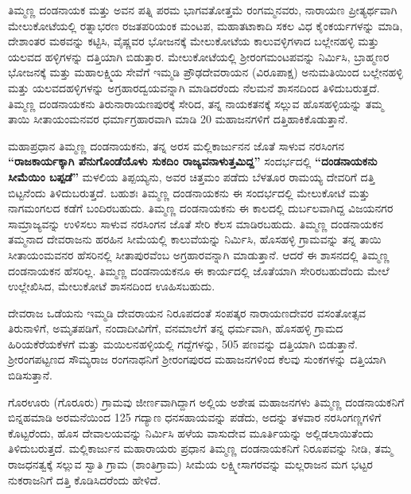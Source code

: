 ತಿಮ್ಮಣ್ಣ ದಂಡನಾಯಕ ಮತ್ತು ಅವನ ಪತ್ನಿ ಪರಮ ಭಾಗವತೋತ್ತಮೆ ರಂಗಮ್ಮನವರು, ನಾರಾಯಣ ಪ್ರೀತ್ಯರ್ಥವಾಗಿ ಮೇಲುಕೋಟೆಯಲ್ಲಿ ರತ್ನಾಭರಣ ರಜತಪರಿಯಂಕ ಮಂಟಪ, ಮಹಾತಟಾಕಾದಿ ಸಕಲ ವಿಧ ಕೈಂಕರ್ಯಗಳನ್ನು ಮಾಡಿ, ದೇಶಾಂತರ ಮಠವನ್ನು ಕಟ್ಟಿಸಿ, ವೈಷ್ಣವರ ಭೋಜನಕ್ಕೆ ಮೇಲುಕೋಟೆಯ ಕಾಲುವಳ್ಳಿಗಳಾದ ಬಲ್ಲೇನಹಳ್ಳಿ ಮತ್ತು ಯಲವದ ಹಳ್ಳಿಗಳನ್ನು ದತ್ತಿಯಾಗಿ ಬಿಡುತ್ತಾರ. ಮೇಲುಕೋಟೆಯಲ್ಲಿ ಶ‍್ರೀರಂಗಮಂಟಪವನ್ನು ನಿರ್ಮಿಸಿ, ಬ್ರಾಹ್ಮಣರ ಭೋಜನಕ್ಕೆ ಮತ್ತು ಮಹಾಲಕ್ಷ್ಮಿಯ ಸೇವೆಗೆ ಇಮ್ಮಡಿ ಪ್ರೌಢದೇವರಾಯನ (ವಿರೂಪಾಕ್ಷ) ಅನುಮತಿಯಿಂದ ಬಲ್ಲೇನಹಳ್ಳಿ ಮತ್ತು ಯಲವದಹಳ್ಳಿಗಳನ್ನು ಅಗ್ರಹಾರದ್ವಯವನ್ನಾಗಿ ಮಾಡಿದರೆಂದು ನೆಲಮನೆ ಶಾಸನದಿಂದ ತಿಳಿದುಬರುತ್ತದೆ. ತಿಮ್ಮಣ್ಣ ದಂಡನಾಯಕನು ತಿರುನಾರಾಯಣಪುರಕ್ಕೆ ಸೇರಿದ, ತನ್ನ ನಾಯಕತನಕ್ಕೆ ಸಲ್ಲುವ ಹೊಸಹಳ್ಳಿಯನ್ನು ತಮ್ಮ ತಾಯಿ ಸೀತಾಯಂಮ\-ನವರ ಧರ್ಮಾಗ್ರಹಾರವಾಗಿ ಮಾಡಿ 20 ಮಹಾಜನಗಳಿಗೆ ದತ್ತಿಹಾಕಿಕೊಡುತ್ತಾನೆ.

ಮಹಾಪ್ರಧಾನ ತಿಮ್ಮಣ್ಣ ದಂಡನಾಯಕನು, ತನ್ನ ಅರಸ ಮಲ್ಲಿಕಾರ್ಜುನನ ಜೊತೆ ಸಾಳುವ ನರಸಿಂಗನ \textbf{“ರಾಜಕಾರ್ಯ\-ಕ್ಕಾಗಿ ಪೆನುಗೊಂಡೆಯೊಳು ಸುಕದಿಂ ರಾಜ್ಯವನಾಳುತ್ತಮಿದ್ದ”} ಸಂದರ್ಭದಲ್ಲಿ \textbf{“ದಂಡನಾಯಕನು ಸೀಮೆಯಿಂ ಬಪ್ಪಡೆ”} ಮಳಲಿಯ ತಿಪ್ಪಯ್ಯನು, ಅವರ ಚಿತ್ತಮಂ ಪಡೆದು ಬೆಳತೂರ ರಾಮಯ್ಯ ದೇವರಿಗೆ ದತ್ತಿ ಬಿಟ್ಟನೆಂದು ತಿಳಿದುಬರುತ್ತದೆ. ಬಹುಶಃ ತಿಮ್ಮಣ್ಣ ದಂಡನಾಯಕನು ಈ ಸಂದರ್ಭದಲ್ಲಿ ಮೇಲುಕೋಟೆ ಮತ್ತು ನಾಗಮಂಗಲದ ಕಡೆಗೆ ಬಂದಿರಬಹುದು. ತಿಮ್ಮಣ್ಣ ದಂಡನಾಯಕನು ಈ ಕಾಲದಲ್ಲಿ ದುರ್ಬಲವಾಗಿದ್ದ ವಿಜಯನಗರ ಸಾಮ್ರಾಜ್ಯವನ್ನು ಉಳಿಸಲು ಸಾಳುವ ನರಸಿಂಗನ ಜೊತೆ ಸೇರಿ ಕೆಲಸ ಮಾಡಿರಬಹುದು. ತಿಮ್ಮಣ್ಣ ದಂಡನಾಯಕನ ತಮ್ಮನಾದ ದೇವರಾಜನು ಹರಹಿನ ಸೀಮೆಯಲ್ಲಿ ಕಾಲುವೆಯನ್ನು ನಿರ್ಮಿಸಿ, ಹೊಸಹಳ್ಳಿ ಗ್ರಾಮವನ್ನು ತನ್ನ ತಾಯಿ ಸೀತಾಯಂಮವನರ ಹೆಸರಿನಲ್ಲಿ ಸೀತಾಪುರವೆಂಬ ಅಗ್ರಹಾರವನ್ನಾಗಿ ಮಾಡುತ್ತಾನೆ. ಆದರೆ ಈ ಶಾಸನದಲ್ಲಿ ತಿಮ್ಮಣ್ಣ ದಂಡನಾಯಕನ ಹೆಸರಿಲ್ಲ. ತಿಮ್ಮಣ್ಣ ದಂಡನಾಯಕನೂ ಈ ಕಾರ್ಯದಲ್ಲಿ ಜೊತೆಯಾಗಿ ಸೇರಿರಬಹುದೆಂದು ಮೇಲೆ ಉಲ್ಲೇಖಿಸಿದ, ಮೇಲುಕೋಟೆ ಶಾಸನದಿಂದ ಊಹಿಸಬಹುದು.

ದೇವರಾಜ ಒಡೆಯನು ಇಮ್ಮಡಿ ದೇವರಾಯನ ನಿರೂಪದಂತೆ ಸಂಪತ್ಕರ ನಾರಾಯಣದೇವರ ವಸಂತೋತ್ಸವ ತಿರುನಾಳಿಗೆ, ಅಮೃತಪಡಿಗೆ, ನಂದಾದೀವಿಗೆಗೆ, ವನಮಾಲೆಗೆ ತನ್ನ ಧರ್ಮವಾಗಿ, ಹೊಸಹಳ್ಳಿ ಗ್ರಾಮದ ಹಿರಿಯಕೆರೆಯಕೆಳಗೆ ಮತ್ತು ಮಯಿಲನಹಳ್ಳಿಯಲ್ಲಿ ಗದ್ದೆಗಳನ್ನು, 505 ಪಣವನ್ನು ದತ್ತಿಯಾಗಿ ಬಿಡುತ್ತಾನೆ. ಶ‍್ರೀರಂಗಪಟ್ಟಣದ ಸೌಮ್ಯರಾಜ ರಂಗನಾಥನಿಗೆ ಶ‍್ರೀರಂಗಪುರದ ಮಹಾಜನಗಳಿಂದ ಕೆಲವು ಸುಂಕಗಳನ್ನು ದತ್ತಿಯಾಗಿ ಬಿಡಿಸುತ್ತಾನೆ.

ಗೊರಊರು (ಗೊರೂರು) ಗ್ರಾಮವು ಜೀರ್ಣವಾಗಿದ್ದಾಗ ಅಲ್ಲಿಯ ಅಶೇಷ ಮಹಾಜನಗಳು ತಿಮ್ಮಣ್ಣ ದಂಡನಾಯಕ\-ನಿಗೆ ಬಿನ್ನಹಮಾಡಿ ಅರಮನೆಯಿಂದ 125 ಗದ್ಯಾಣ ಧನಸಹಾಯವನ್ನು ಪಡೆದು, ಅದನ್ನು ತಳವಾರ ನರಸಿಂಗಣ್ಣಗಳಿಗೆ ಕೊಟ್ಟರೆಂದು, ಹೊಸ ದೇವಾಲಯವನ್ನು ನಿರ್ಮಿಸಿ ಹಳೆಯ ವಾಸುದೇವ ಮೂರ್ತಿಯನ್ನು ಅಲ್ಲಿಡಲಾಯಿತೆಂದು ತಿಳಿದು\-ಬರುತ್ತದೆ. ಮಲ್ಲಿಕಾರ್ಜುನ ಮಹಾರಾಯರು ಪ್ರಧಾನ ತಿಮ್ಮಣ್ಣ ದಂಡನಾಯಕನಿಗೆ ನಿರೂಪವನ್ನು ನೀಡಿ, ತಮ್ಮ ರಾಜಧನತ್ವಕ್ಕೆ ಸಲ್ಲುವ ಸ್ವಾತಿ ಗ್ರಾಮ (ಶಾಂತಿಗ್ರಾಮ) ಸೀಮೆಯ ಲಕ್ಷ್ಮೀಸಾಗರವನ್ನು ಮಲ್ಲರಾಜನ ಮಗ ಭಟ್ಟರ ನುಕರಾಜನಿಗೆ ದತ್ತಿ ಕೊಡಿಸಿದರೆಂದು ಹೇಳಿದೆ.

